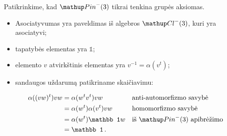 \begin{example}
	Patikrinkime, kad $\pinm$ tikrai tenkina grupės aksiomas.
	\begin{itemize}
		\item Asociatyvumas yra paveldimas iš algebros
			$\Clm$,
			kuri yra asociatyvi;
		\item tapatybės elementas yra $\mathbb 1$;
		\item elemento $v$ atvirkštinis elementas yra $v^{-1}= \alpha(v^t)$;
		\item sandaugos uždarumą patikriname skaičiavimu:
	\end{itemize}
	\begin{equation}
		\begin{aligned}
			\alpha((vw)^t) vw &= \alpha(w^t v^t) vw && \text{anti-automorfizmo savybė}
			\\
			&= \alpha(w^t) \alpha(v^t) vw && \text{homomorfizmo savybė}
			\\
			&= \alpha(w^t) \mathbb 1 w && \text{iš $\pinm$ apibrėžimo}
			\\
			&= \mathbb 1
			\,.
		\end{aligned}
	\end{equation}
\end{example}

